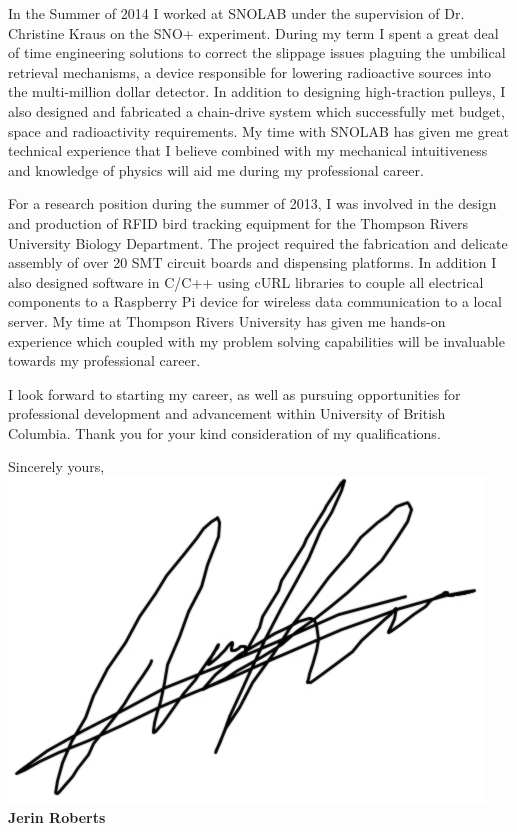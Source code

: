 \documentclass[11pt,a4paper]{moderncv} %
\begin{document}
In the Summer of 2014 I worked at SNOLAB under the supervision of Dr. Christine Kraus on the SNO+ experiment. During my term I spent a great deal of time engineering solutions to correct the slippage issues plaguing the umbilical retrieval mechanisms, a device responsible for lowering radioactive sources into the multi-million dollar detector. In addition to designing high-traction pulleys, I also designed and fabricated a chain-drive system which successfully met budget, space and radioactivity requirements. My time with SNOLAB has given me great technical experience that I believe combined with my mechanical intuitiveness and knowledge of physics will aid me during my professional career.

For a research position during the summer of 2013, I was involved in the design and production of RFID bird tracking equipment for the Thompson Rivers University Biology Department. The project required the fabrication and delicate assembly of over 20 SMT circuit boards and dispensing platforms. In addition I also designed software in C/C++ using cURL libraries to couple all electrical components to a Raspberry Pi device for wireless data communication to a local server. My time at Thompson Rivers University has given me hands-on experience which coupled with my problem solving capabilities will be invaluable towards my professional career.


 

I look forward to starting my career, as well as pursuing opportunities for professional development and advancement within University of British Columbia. Thank you for your kind consideration of my qualifications.

Sincerely yours,
\newline
\space \includegraphics[width=0.12\linewidth]{signature}
\newline
\textbf{Jerin Roberts}


\end{document}
